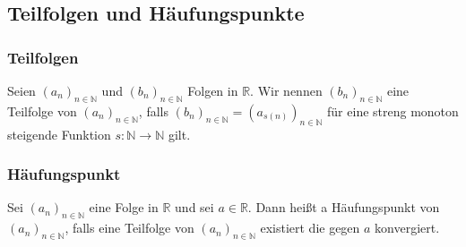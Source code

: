 \documentclass[11pt]{article}
\begin{document}
    \subsection{Teilfolgen und Häufungspunkte}
    \subsubsection{Teilfolgen}
    Seien $(a_n)_{n\in\mathbb{N}}$ und $(b_n)_{n\in\mathbb{N}}$ Folgen in $\mathbb{R}$. Wir nennen $(b_n)_{n\in\mathbb{N}}$ eine Teilfolge von $(a_n)_{n\in\mathbb{N}}$, falls\newline\newline
    \hspace*{10mm} $(b_n)_{n\in\mathbb{N}}=(a_{s(n)})_{n\in\mathbb{N}}$ \newline\newline
    für eine streng monoton steigende Funktion $s:\mathbb{N}\rightarrow\mathbb{N}$ gilt.
    \subsubsection{Häufungspunkt}
    Sei $(a_n)_{n\in\mathbb{N}}$ eine Folge in $\mathbb{R}$ und sei $a\in\mathbb{R}$. Dann heißt a Häufungspunkt von $(a_n)_{n\in\mathbb{N}}$, falls eine
    Teilfolge von $(a_n)_{n\in\mathbb{N}}$ existiert die gegen $a$ konvergiert.
\end{document}

